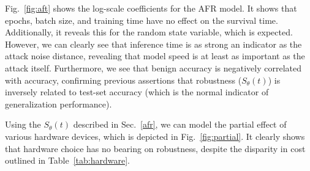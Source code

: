 \documentclass[conference]{IEEEtran}
\begin{document}
Fig.~\ref{fig:aft} shows the log-scale coefficients for the AFR model. It shows that epochs, batch size, and training time have no effect on the survival time. Additionally, it reveals this for the random state variable, which is expected. However, we can clearly see that inference time  is as strong an indicator as the attack noise distance, revealing that model speed is at least as important as the attack itself. Furthermore, we see that benign accuracy is negatively correlated with accuracy, confirming previous assertions that robustness ($S_{\theta}(t)$) is inversely related to test-set accuracy (which is the normal indicator of generalization performance)\cite{carlini_towards_2017}.

Using the $S_{\theta}(t)$ described in Sec.~\ref{afr}, we can model the partial effect of various hardware devices, which is depicted in Fig.~\ref{fig:partial}. It clearly shows that hardware choice has no bearing on robustness, despite the disparity in cost outlined in Table~\ref{tab:hardware}.
\end{document}
